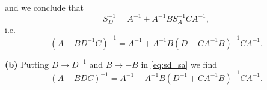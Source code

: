 \documentclass{article}
\makeatletter
\newcommand*{\shifttext}[1]{%
  \settowidth{\@tempdima}{#1}%
  \hspace{-\@tempdima}#1%
}
\newcommand{\plabel}[1]{%
\shifttext{\textbf{#1}\quad}%
}
\makeatother
\begin{document}
and we conclude that
\begin{equation*}
    S_D^{-1} = A^{-1} + A^{-1}B S^{-1}_A C A^{-1},
\end{equation*}
i.e.
\begin{equation}
    \label{eq:sd_sa} (A - BD^{-1}C)^{-1} = A^{-1} + A^{-1}B (D - CA^{-1}B)^{-1} C A^{-1}.
\end{equation}

\plabel{(b)}%
Putting $D\rightarrow D^{-1}$ and $B\rightarrow -B$ in \cref{eq:sd_sa} we find
\begin{equation}
    (A + BDC)^{-1} = A^{-1} - A^{-1} B (D^{-1} + CA^{-1}B)^{-1}CA^{-1}.
\end{equation}
\end{document}
